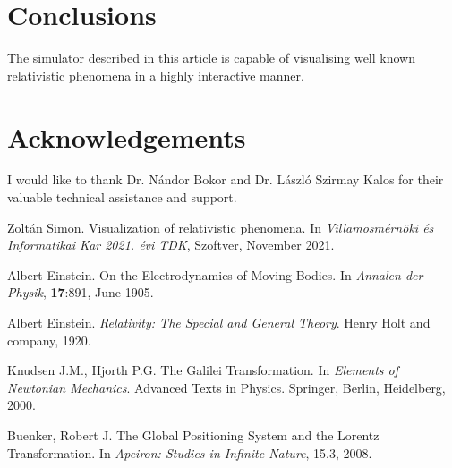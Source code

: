 \documentclass{egpubl}
\begin{document}
\section{Conclusions}
\label{sec:concl}
The simulator described in this article is capable of visualising well known relativistic phenomena in a highly interactive manner. 


\section*{Acknowledgements}
I would like to thank Dr. Nándor Bokor and Dr. László Szirmay Kalos for their valuable technical assistance and support.

\newpage

\begin{thebibliography}{1}


 Zoltán Simon.
\newblock Visualization of relativistic phenomena.
In \emph{Villamosmérnöki és Informatikai Kar 2021. évi TDK}, Szoftver, November 2021.

 Albert Einstein.
\newblock On the Electrodynamics of Moving Bodies.
In \emph{Annalen der Physik}, \textbf{17}:891, June 1905.

 Albert Einstein.
\newblock \emph{Relativity: The Special and General Theory}.
Henry Holt and company, 1920.

 Knudsen J.M., Hjorth P.G. The Galilei Transformation.
In \emph{Elements of Newtonian Mechanics}. Advanced Texts in Physics. Springer, Berlin, Heidelberg, 2000.

 Buenker, Robert J.
\newblock The Global Positioning System and the Lorentz Transformation.
In \emph{Apeiron: Studies in Infinite Nature}, 15.3, 2008.


\end{thebibliography}
\end{document}
